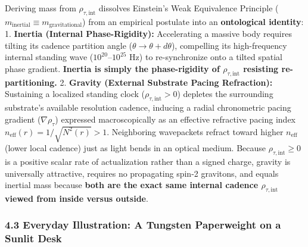 \documentclass[
]{article}
\begin{document}
Deriving mass from \(\rho_{\tau,\text{int}}\) dissolves Einstein's Weak
Equivalence Principle
(\(m_{\text{inertial}} \equiv m_{\text{gravitational}}\)) from an
empirical postulate into an \textbf{ontological identity}: 1.
\textbf{Inertia (Internal Phase-Rigidity):} Accelerating a massive body
requires tilting its cadence partition angle
(\(\theta \to \theta + d\theta\)), compelling its high-frequency
internal standing wave (\(10^{20}\text{–}10^{25}\text{ Hz}\)) to
re-synchronize onto a tilted spatial phase gradient. \textbf{Inertia is
simply the phase-rigidity of \(\rho_{\tau,\text{int}}\) resisting
re-partitioning.} 2. \textbf{Gravity (External Substrate Pacing
Refraction):} Sustaining a localized standing clock
(\(\rho_{\tau,\text{int}} > 0\)) depletes the surrounding substrate's
available resolution cadence, inducing a radial chronometric pacing
gradient (\(\nabla\rho_\tau\)) expressed macroscopically as an effective
refractive pacing index \(n_{\text{eff}}(r) = 1 / \sqrt{N^2(r)} > 1\).
Neighboring wavepackets refract toward higher \(n_{\text{eff}}\) (lower
local cadence) just as light bends in an optical medium. Because
\(\rho_{\tau,\text{int}} \ge 0\) is a positive scalar rate of
actualization rather than a signed charge, gravity is universally
attractive, requires no propagating spin-2 gravitons, and equals
inertial mass because \textbf{both are the exact same internal cadence
\(\rho_{\tau,\text{int}}\) viewed from inside versus outside}.

\subsubsection{4.3 Everyday Illustration: A Tungsten Paperweight on a
Sunlit
Desk}\label{everyday-illustration-a-tungsten-paperweight-on-a-sunlit-desk}
\end{document}
